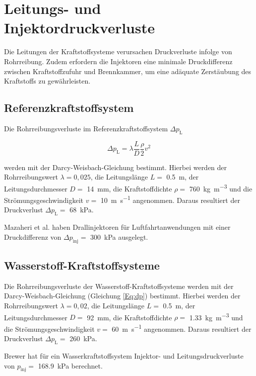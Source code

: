 \section{Leitungs- und Injektordruckverluste}

Die Leitungen der Kraftstoffsysteme verursachen Druckverluste infolge von Rohrreibung. Zudem erfordern die Injektoren eine minimale Druckdifferenz zwischen Kraftstoffzufuhr und Brennkammer, um eine adäquate Zerstäubung des Kraftstoffs zu gewährleisten.

\subsection{Referenzkraftstoffsystem}

Die Rohrreibungsverluste im Referenzkraftstoffsystem $\Delta p_\mathrm{L}$ 

\begin{equation}\label{Eq:dp}
	\Delta p_\mathrm{L}=\lambda\frac{L}{D}\frac{\rho}{2}v^2
\end{equation}

werden mit der Darcy-Weisbach-Gleichung bestimmt. Hierbei werden der Rohrreibungswert $\lambda=0,025$, die Leitungslänge $L=$ \SI{0.5}{\m}, der Leitungsdurchmesser $D=$ \SI{14}{\milli\m}, die Kraftstoffdichte $\rho=$ \SI{760}{\kg\per\m\cubed} und die Strömungsgeschwindigkeit $v=$ \SI{10}{\m\per\s} angenommen. Daraus resultiert der Druckverlust $\Delta p_\mathrm{L}=$ \SI{68}{\kilo\Pa}. 

Mazaheri et al. \cite{Mazaheri.2012} haben Drallinjektoren für Luftfahrtanwendungen mit einer Druckdifferenz von $\Delta p_{\mathrm{inj}}=$ \SI{300}{\kilo\Pa} ausgelegt.

\subsection{Wasserstoff-Kraftstoffsysteme}

Die Rohrreibungsverluste der Wasserstoff-Kraftstoffsysteme werden mit der Darcy-Weisbach-Gleichung (Gleichung \ref{Eq:dp}) bestimmt. Hierbei werden der Rohrreibungswert $\lambda=0,02$, die Leitungslänge $L=$ \SI{0.5}{\m}, der Leitungsdurchmesser $D=$ \SI{92}{\milli\m}, die Kraftstoffdichte $\rho=$ \SI{1.33}{\kg\per\m\cubed} und die Strömungsgeschwindigkeit $v=$ \SI{60}{\m\per\s} angenommen. Daraus resultiert der Druckverlust $\Delta p_\mathrm{L}=$ \SI{260}{\kilo\Pa}. 


Brewer \cite{Brewer.1991} hat für ein Wasserkraftstoffsystem Injektor- und Leitungsdruckverluste von $p_{\mathrm{inj}}=$ \SI{168.9}{\kilo\Pa} berechnet.

